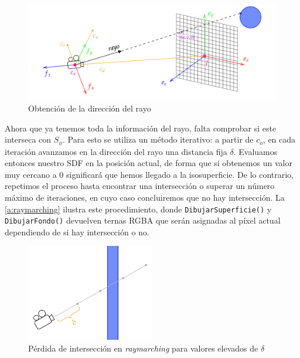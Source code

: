 \begin{figure}[ht!]
    \centering
    \includegraphics[width=\textwidth]{Plantilla-TFG-master/img/raydir.png}
    \caption{Obtención de la dirección del rayo}
    \label{fig:raydir}
\end{figure}

Ahora que ya tenemos toda la información del rayo, falta comprobar si este interseca con $S_{\phi}$. Para esto se utiliza un método iterativo: a partir de $c_o$, en cada iteración avanzamos en la dirección del rayo una distancia fija $\delta$. Evaluamos entonces nuestro SDF en la posición actual, de forma que si obtenemos un valor muy cercano a $0$ significará que hemos llegado a la isosuperficie. De lo contrario, repetimos el proceso hasta encontrar una intersección o superar un número máximo de iteraciones, en cuyo caso concluiremos que no hay intersección. La \autoref{a:raymarching} ilustra este procedimiento, donde \texttt{DibujarSuperficie()} y \texttt{DibujarFondo()} devuelven ternas RGBA que serán asignadas al píxel actual dependiendo de si hay intersección o no.\newline

\begin{figure}[ht!]
    \centering
    \includegraphics[width=0.5\textwidth]{Plantilla-TFG-master/img/miss.png}
    \caption{Pérdida de intersección en \textit{raymarching} para valores elevados de $\delta$}
    \label{fig:miss}
\end{figure}

